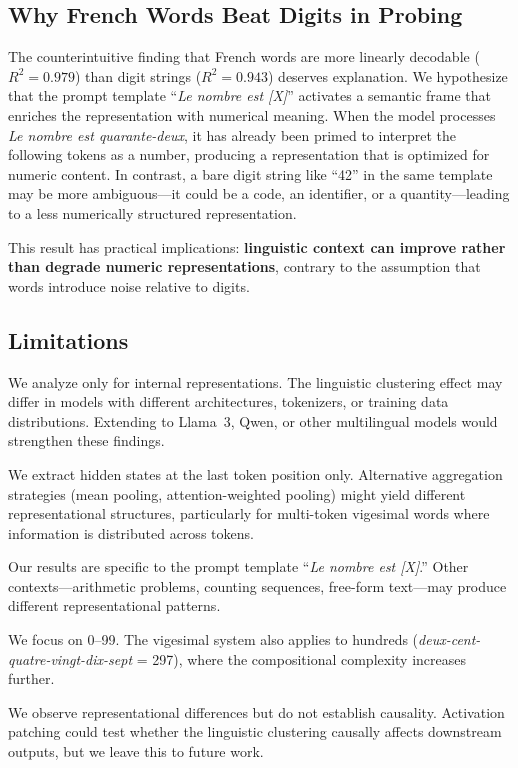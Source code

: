 \subsection{Why French Words Beat Digits in Probing}
\label{sec:disc_words}

The counterintuitive finding that French words are more linearly decodable ($R^2 = 0.979$) than digit strings ($R^2 = 0.943$) deserves explanation.
We hypothesize that the prompt template ``\emph{Le nombre est [X]}'' activates a semantic frame that enriches the representation with numerical meaning.
When the model processes \emph{Le nombre est quarante-deux}, it has already been primed to interpret the following tokens as a number, producing a representation that is optimized for numeric content.
In contrast, a bare digit string like ``42'' in the same template may be more ambiguous---it could be a code, an identifier, or a quantity---leading to a less numerically structured representation.

This result has practical implications: \textbf{linguistic context can improve rather than degrade numeric representations}, contrary to the assumption that words introduce noise relative to digits.

\subsection{Limitations}
\label{sec:limitations}

We analyze only \mistral for internal representations.
The linguistic clustering effect may differ in models with different architectures, tokenizers, or training data distributions.
Extending to Llama~3, Qwen, or other multilingual models would strengthen these findings.

We extract hidden states at the last token position only.
Alternative aggregation strategies (mean pooling, attention-weighted pooling) might yield different representational structures, particularly for multi-token vigesimal words where information is distributed across tokens.

Our results are specific to the prompt template ``\emph{Le nombre est [X]}.''
Other contexts---arithmetic problems, counting sequences, free-form text---may produce different representational patterns.

We focus on 0--99.
The vigesimal system also applies to hundreds (\eg \emph{deux-cent-quatre-vingt-dix-sept} = 297), where the compositional complexity increases further.

We observe representational differences but do not establish causality.
Activation patching \citep{levy2024language} could test whether the linguistic clustering causally affects downstream outputs, but we leave this to future work.
